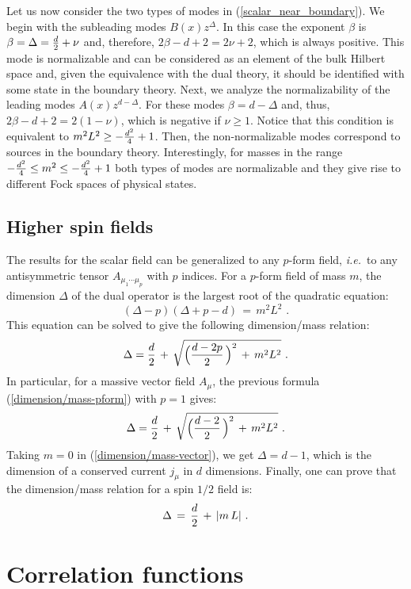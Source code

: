 \documentclass[12pt,notitlepage]{article}
\newcommand{\beq}{\begin{equation}}
\newcommand{\eeq}{\end{equation}}
\def\ie{{\emph{i.e.}}}
\begin{document}
Let us now consider the two types of modes in (\ref{scalar_near_boundary}). We begin with the subleading modes $B(x)z^{\Delta}$.  In this case  the exponent  $\beta$ is $\beta= \Delta={d\over 2}+\nu$ and, therefore,  $2\beta-d+2=2\nu+2$, which is always positive. This mode is normalizable and can be considered as an element of the bulk Hilbert space and, given the equivalence with the dual theory, it should be identified with some state in the boundary theory. Next, we analyze the normalizability of the leading modes $A(x)z^{d-\Delta}$. 
For these modes $\beta=d-\Delta$ and, thus,   $2\beta-d+2=2(1-\nu)$, which is negative if $\nu\ge 1$. Notice that this condition is equivalent to $m^2 L^2\ge -{d^2\over 4}+1$. Then, the non-normalizable modes correspond to sources in the boundary theory. 
Interestingly,  for masses in the range $-{d^2\over 4}\le m^2\le  -{d^2\over 4}+1$ both types of modes are normalizable and they give rise to different Fock spaces of physical states. 

\subsection{Higher spin fields}

The results for the scalar field can be generalized to any $p$-form field, \ie\ to any antisymmetric tensor $A_{\mu_1\cdots \mu_p}$ with $p$ indices. For a $p$-form field of mass $m$, the dimension $\Delta$ of the dual operator is the largest root of the quadratic equation:
\beq
(\Delta-p)(\Delta+p-d)\,=\,m^2L^2\,\,.
\eeq
This equation can be solved to give the following dimension/mass relation:
\beq
\Delta={d\over 2}\,+\,\sqrt{
\Big({d-2p\over 2}\,\Big)^2\,+\,m^2 L^2}\,\,.
\label{dimension/mass-pform}
\eeq
In particular, for a massive vector field $A_{\mu}$, the previous formula (\ref{dimension/mass-pform}) with $p=1$ gives:
\beq
\Delta={d\over 2}\,+\,\sqrt{
\Big({d-2\over 2}\,\Big)^2\,+\,m^2 L^2}\,\,.
\label{dimension/mass-vector}
\eeq
Taking $m=0$ in (\ref{dimension/mass-vector}), we get $\Delta=d-1$, which is  the dimension of a conserved current $j_{\mu}$ in $d$ dimensions. Finally, one can prove that the dimension/mass relation for  a spin $1/2$ field is:
\beq
\Delta\,=\,{d\over 2}\,+\,|m\,L|\,\,.
\eeq


\section{Correlation functions}
\end{document}
